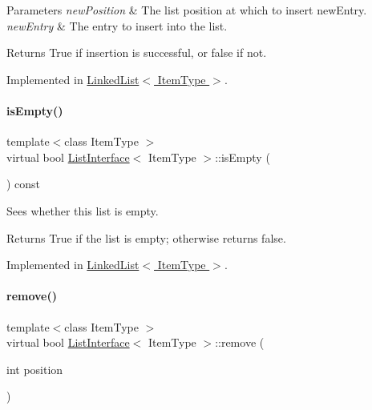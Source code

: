 \begin{DoxyParams}{Parameters}
{\em new\+Position} & The list position at which to insert new\+Entry. \\
\hline
{\em new\+Entry} & The entry to insert into the list. \\
\hline
\end{DoxyParams}
\begin{DoxyReturn}{Returns}
True if insertion is successful, or false if not. 
\end{DoxyReturn}


Implemented in \hyperlink{class_linked_list_ae8a19375505e87e2e4fc0e9b5afe4d4d}{Linked\+List$<$ Item\+Type $>$}.

\hypertarget{class_list_interface_a924f91e7f81d7dcd3fda79bbcc671394}{}\label{class_list_interface_a924f91e7f81d7dcd3fda79bbcc671394} 
\paragraph{\texorpdfstring{is\+Empty()}{isEmpty()}}
{\footnotesize\ttfamily template$<$class Item\+Type $>$ \\
virtual bool \hyperlink{class_list_interface}{List\+Interface}$<$ Item\+Type $>$\+::is\+Empty (\begin{DoxyParamCaption}{ }\end{DoxyParamCaption}) const\hspace{0.3cm}{\ttfamily [pure virtual]}}

Sees whether this list is empty. \begin{DoxyReturn}{Returns}
True if the list is empty; otherwise returns false. 
\end{DoxyReturn}


Implemented in \hyperlink{class_linked_list_a008e916c3d51d28b4cc9c8cdf3e9d921}{Linked\+List$<$ Item\+Type $>$}.

\hypertarget{class_list_interface_a5543002ec0d64bd2a63f3732f437af65}{}\label{class_list_interface_a5543002ec0d64bd2a63f3732f437af65} 
\paragraph{\texorpdfstring{remove()}{remove()}}
{\footnotesize\ttfamily template$<$class Item\+Type $>$ \\
virtual bool \hyperlink{class_list_interface}{List\+Interface}$<$ Item\+Type $>$\+::remove (\begin{DoxyParamCaption}\item[{int}]{position }\end{DoxyParamCaption})\hspace{0.3cm}{\ttfamily [pure virtual]}}

